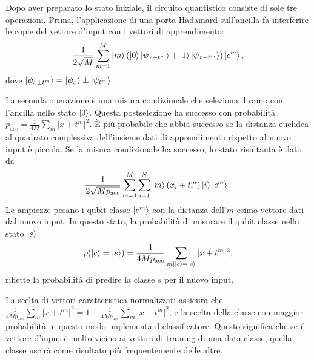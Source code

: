 Dopo aver preparato lo stato iniziale, il circuito quantistico 
consiste di sole tre operazioni. Prima, l'applicazione di 
una porta Hadamard sull'ancilla fa interferire le copie 
del vettore d'input con i vettori di apprendimento: 
\begin{equation}
    \frac{1}{2\sqrt{M}} \sum_{m=1}^M \ket{m}
    \left( \ket{0}\ket{\psi_{x+t^m}} + \ket{1}  
    \ket{\psi_{x-t^m}} \right) \ket{c^m},
\end{equation}
dove $\ket{\psi_{x \pm t^m}} = \ket{\psi_x} \pm \ket{\psi_{t^m}}$. 

La seconda operazione è una misura condizionale che seleziona 
il ramo con l'ancilla nello stato $\ket{0}$. Questa 
postselezione ha successo con probabilità 
$p_\text{acc} = \frac{1}{4M}\sum_m |x+t^m|^2$. 
È più probabile che abbia successo se la distanza euclidea 
al quadrato complessiva dell'insieme dati di apprendimento 
rispetto al nuovo input è piccola. 
Se la misura condizionale ha successo, lo stato risultanta 
è dato da 
\begin{equation}
    \frac{1}{2\sqrt{Mp_{\text{acc}}}} \sum_{m=1}^M \sum_{i=1}^N 
    \ket{m} ( x_i + t_i^m ) \ket{i} \ket{c^m}.
\end{equation}
Le ampiezze pesano i qubit classe $\ket{c^m}$ con la 
distanza dell'$m$-esimo vettore dati dal nuovo input. 
In questo stato, la probabilità di misurare il qubit 
classe nello stato $\ket{s}$ 
\begin{equation} \label{eq:prob.classe}
    p(\ket{c}=\ket{s}) = \frac{1}{4Mp_{\text{acc}}} 
    \sum_{m|\ket{c}=\ket{s}} |x+t^m|^2,
\end{equation}
riflette la probabilità di predire la classe $s$ per il 
nuovo input. 

La scelta di vettori caratteristica normalizzati assicura che \\ 
$\frac{1}{4Mp_{\text{acc}}}\sum_m |x+t^m|^2 = 
1 - \frac{1}{4Mp_{\text{acc}}}\sum_m |x-t^m|^2$, e la scelta 
della classe con maggior probabilità in questo modo 
implementa il classificatore. 
Questo significa che se il vettore d'input è molto 
vicino ai vettori di training di una data classe, 
quella classe uscirà come risultato più frequentemente 
delle altre. 


